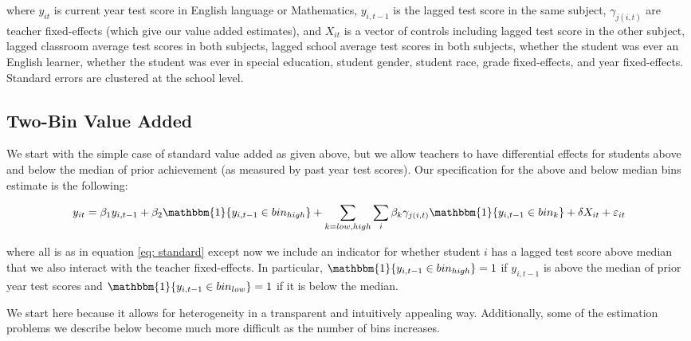 \documentclass[letterpaper,12pt]{article}
\begin{document}
\noindent where $y_{it}$ is current year test score in English language or Mathematics, $y_{i,t-1}$ is the lagged test score in the same subject, $\gamma_{j(i,t)}$ are teacher fixed-effects (which give our value added estimates), and $X_{it}$ is a vector of controls including lagged test score in the other subject, lagged classroom average test scores in both subjects, lagged school average test scores in both subjects, whether the student was ever an English learner, whether the student was ever in special education, student gender, student race, grade fixed-effects, and year fixed-effects. Standard errors are clustered at the school level.




\subsection{Two-Bin Value Added}

We start with the simple case of standard value added as given above, but we allow teachers to have differential effects for students above and below the median of prior achievement (as measured by past year test scores). Our specification for the above and below median bins estimate is the following:

    \begin{equation}\label{eq: bins}
        y_{it} = \beta_1 y_{i,t-1} + \beta_2 \mathbbm{1}\{y_{i,t-1} \in bin_{high}\}
        + \sum_{k=low, high}\sum_{i}\beta_k \gamma_{j(i,t)} \mathbbm{1}\{y_{i,t-1} \in bin_k\} + \delta X_{it} + \varepsilon_{it}
    \end{equation} 
    
\noindent where all is as in equation \ref{eq: standard} except now we include an indicator for whether student $i$ has a lagged test score above median that we also interact with the teacher fixed-effects. In particular, $\mathbbm{1}\{y_{i,t-1} \in bin_{high}\} = 1$ if $y_{i,t-1}$ is above the median of prior year test scores and $\mathbbm{1}\{y_{i,t-1} \in bin_{low}\} = 1$ if it is below the median.

We start here because it allows for heterogeneity in a transparent and intuitively appealing way. Additionally, some of the estimation problems we describe below become much more difficult as the number of bins increases.



\end{document}
